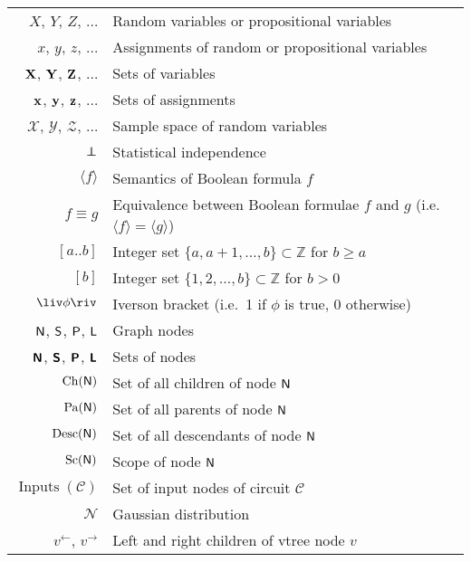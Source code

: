 \begin{tabular}{rl}
        $X$, $Y$, $Z$, $\ldots$ & Random variables or propositional variables\\
        $x$, $y$, $z$, $\ldots$ & Assignments of random or propositional variables\\
        $\mathbf{X}$, $\mathbf{Y}$, $\mathbf{Z}$, $\ldots$ & Sets of variables\\
        $\mathbf{x}$, $\mathbf{y}$, $\mathbf{z}$, $\ldots$ & Sets of assignments\\
        $\mathcal{X}$, $\mathcal{Y}$, $\mathcal{Z}$, $\ldots$ & Sample space of random variables\\
        $\indep$ & Statistical independence\\
        $\langle f\rangle$ & Semantics of Boolean formula $f$\\
        $f\equiv g$ & Equivalence between Boolean formulae $f$ and $g$ (i.e.\ $\langle f\rangle = \langle g\rangle$)\\
        $\left[a..b\right]$ & Integer set $\{a,a+1,\ldots,b\}\subset\mathbb{Z}$ for $b\geq a$\\
        $\left[b\right]$ & Integer set $\{1,2,\ldots,b\}\subset\mathbb{Z}$ for $b>0$\\
        $\liv\phi\riv$ & Iverson bracket (i.e.\ 1 if $\phi$ is true, 0 otherwise)\\
        $\operatorname{\textup{\textsf{N}}}$, $\operatorname{\textup{\textsf{S}}}$, $\operatorname{\textup{\textsf{P}}}$, $\operatorname{\textup{\textsf{L}}}$ & Graph nodes\\
        $\operatorname{\textup{\textsf{\textbf{N}}}}$, $\operatorname{\textup{\textsf{\textbf{S}}}}$, $\operatorname{\textup{\textsf{\textbf{P}}}}$, $\operatorname{\textup{\textsf{\textbf{L}}}}$ & Sets of nodes\\
        $\operatorname*{\normalfont{Ch}}(\operatorname{\textup{\textsf{N}}})$ & Set of all children of node $\operatorname{\textup{\textsf{N}}}$\\
        $\operatorname*{\normalfont{Pa}}(\operatorname{\textup{\textsf{N}}})$ & Set of all parents of node $\operatorname{\textup{\textsf{N}}}$\\
        $\operatorname*{\normalfont{Desc}}(\operatorname{\textup{\textsf{N}}})$ & Set of all descendants of node $\operatorname{\textup{\textsf{N}}}$\\
        $\operatorname*{\normalfont{Sc}}(\operatorname{\textup{\textsf{N}}})$ & Scope of node $\operatorname{\textup{\textsf{N}}}$\\
        $\operatorname{Inputs}(\mathcal{C})$ & Set of input nodes of circuit $\mathcal{C}$\\
        $\mathcal{N}$ & Gaussian distribution\\
        $v^\gets$, $v^\to$ & Left and right children of vtree node $v$\\

\end{tabular}



